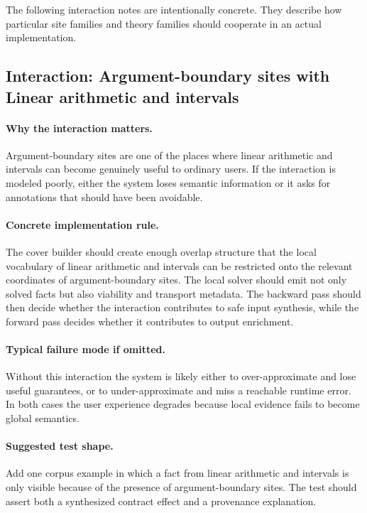 \documentclass[11pt]{report}
\theoremstyle{definition}
\theoremstyle{plain}
\begin{document}
The following interaction notes are intentionally concrete. They describe how particular site families and theory families should cooperate in an actual implementation.
\subsection{Interaction: Argument-boundary sites with Linear arithmetic and intervals}

\paragraph{Why the interaction matters.}
Argument-boundary sites are one of the places where linear arithmetic and intervals can become
genuinely useful to ordinary users. If the interaction is modeled poorly,
either the system loses semantic information or it asks for annotations that
should have been avoidable.

\paragraph{Concrete implementation rule.}
The cover builder should create enough overlap structure that the local
vocabulary of linear arithmetic and intervals can be restricted onto the relevant
coordinates of argument-boundary sites. The local solver should emit not only
solved facts but also viability and transport metadata. The backward pass
should then decide whether the interaction contributes to safe input
synthesis, while the forward pass decides whether it contributes to output
enrichment.

\paragraph{Typical failure mode if omitted.}
Without this interaction the system is likely either to over-approximate and
lose useful guarantees, or to under-approximate and miss a reachable runtime
error. In both cases the user experience degrades because local evidence
fails to become global semantics.

\paragraph{Suggested test shape.}
Add one corpus example in which a fact from linear arithmetic and intervals is only
visible because of the presence of argument-boundary sites. The test should
assert both a synthesized contract effect and a provenance explanation.
\end{document}
